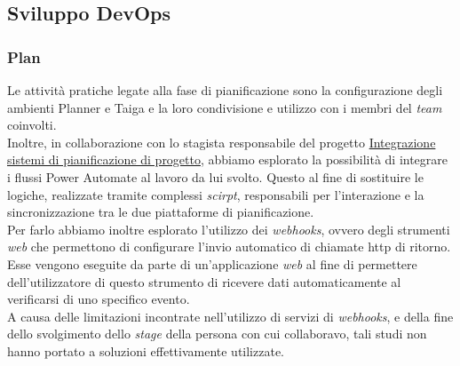 \subsection{Sviluppo DevOps}
\label{Sviluppo DevOps}
\subsubsection*{Plan} 
Le attività pratiche legate alla fase di pianificazione sono la configurazione degli ambienti Planner e Taiga e la loro condivisione e utilizzo con i membri del \emph{team} coinvolti.\\
Inoltre, in collaborazione con lo stagista responsabile del progetto \hyperref[stageGiacomo]{Integrazione sistemi di pianificazione di progetto}, abbiamo esplorato la possibilità di integrare i flussi Power Automate al lavoro da lui svolto.
Questo al fine di sostituire le logiche, realizzate tramite complessi \emph{scirpt}, responsabili per l'interazione e la sincronizzazione tra le due piattaforme di pianificazione.\\
Per farlo abbiamo inoltre esplorato l'utilizzo dei \emph{webhooks}, ovvero degli strumenti \emph{web} che permettono di configurare l'invio automatico di chiamate \gls{http} di ritorno.
Esse vengono eseguite da parte di un'applicazione \emph{web} al fine di permettere dell'utilizzatore di questo strumento di ricevere dati automaticamente al verificarsi di uno specifico evento.\\
A causa delle limitazioni incontrate nell'utilizzo di servizi di \emph{webhooks}, e della fine dello svolgimento dello \emph{stage} della persona con cui collaboravo, tali studi non hanno portato a soluzioni effettivamente utilizzate.

